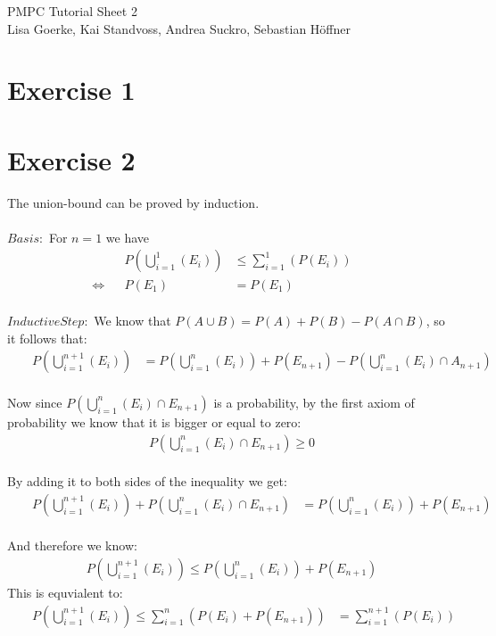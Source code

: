 \documentclass{article}
\begin{document}
\begin{center}
\LARGE PMPC Tutorial Sheet 2\\
\small Lisa Goerke, Kai Standvoss, Andrea Suckro, Sebastian H\"offner
\end{center}
\vspace{0.5cm}
\normalsize

\section*{Exercise 1}

\setcounter{equation}{0}
\section*{Exercise 2}
The union-bound can be proved by induction.\\
\\
$Basis:$
For $n=1$ we have
\begin{align}
& & P(\bigcup_{i=1}^{1}(E_i)) & \leq \sum_{i=1}^{1}(P(E_i)) & & \\
\Leftrightarrow & & P(E_1) & = P(E_1) & & 
\end{align}
\\
$Inductive Step:$
We know that $P(A \cup B) = P(A) + P(B) - P(A \cap B)$, so it follows that:
\begin{align}
& & P(\bigcup_{i=1}^{n+1}(E_i)) & = P(\bigcup_{i=1}^{n}(E_i)) + P(E_{n+1}) - P(\bigcup_{i=1}^{n}(E_i) \cap A_{n+1}) & &
\end{align}
\\
Now since $P(\bigcup_{i=1}^{n}(E_i) \cap E_{n+1})$ is a probability, by the first axiom of probability we know that it is bigger or equal to zero:\\
\begin{align}
 P(\bigcup_{i=1}^{n}(E_i) \cap E_{n+1}) \geq 0 
\end{align}
\\
By adding it to both sides of the inequality we get:\\
\begin{align}
& & P(\bigcup_{i=1}^{n+1}(E_i)) + P(\bigcup_{i=1}^{n}(E_i) \cap E_{n+1}) & = P(\bigcup_{i=1}^{n}(E_i)) + P(E_{n+1})  & &
\end{align}
\\
And therefore we know:
\begin{align}
& & P(\bigcup_{i=1}^{n+1}(E_i)) \leq P(\bigcup_{i=1}^{n}(E_i)) + P(E_{n+1})  & &
\end{align}
This is equvialent to:
\begin{align}
& & P(\bigcup_{i=1}^{n+1}(E_i)) \leq \sum_{i=1}^{n}(P(E_i) + P(E_{n+1})) & = \sum_{i=1}^{n+1}(P(E_i)) & &
\end{align}
\\
\end{document}
